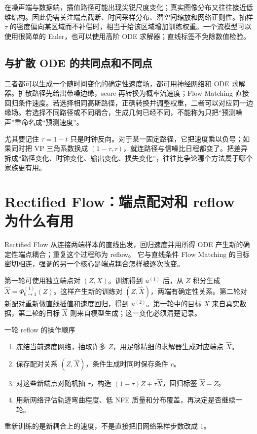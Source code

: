 在噪声端与数据端，插值路径可能出现尖锐尺度变化；真实图像分布又往往接近低维结构。因此仍需关注端点截断、时间采样分布、潜空间缩放和网络正则性。抽样 $\tau$ 的密度偏向某区域而不补偿时，相当于给该区域增加训练权重。一个流模型可以使用很简单的 Euler，也可以使用高阶 ODE 求解器；直线标签不免除数值检验。

\subsection{与扩散 ODE 的共同点和不同点}

二者都可以生成一个随时间变化的确定性速度场，都可用神经网络和 ODE 求解器。扩散路径先给出带噪边缘，score 再转换为概率流速度；Flow Matching 直接回归条件速度。若选择相同高斯路径，正确转换并调整权重，二者可以对应同一边缘场。若选择不同路径或不同耦合，生成几何已经不同，不能称为只把“预测噪声”重命名成“预测速度”。

尤其要记住 $\tau=1-t$ 只是时钟反向。对于某一固定路径，它把速度乘以负号；如果同时把 VP 三角系数换成 $(1-\tau,\tau)$，就连路径与信噪比日程都变了。把差异拆成“路径变化、时钟变化、输出变化、损失变化”，往往比争论哪个方法属于哪个家族更有用。

\section{Rectified Flow：端点配对和 reflow 为什么有用}
\label{sec:m-rectified}

Rectified Flow 从连接两端样本的直线出发，回归速度并用所得 ODE 产生新的确定性端点耦合；重复这个过程称为 reflow。\cite{m_rectified} 它与直线条件 Flow Matching 的目标密切相连，强调的另一个核心是端点耦合怎样被逐次改变。

第一轮可使用独立端点对 $(Z,X)$。训练得到 $u^{(1)}$ 后，从 $Z$ 积分生成
$\widehat X=\Phi^{(1)}_{0\to1}(Z)$。这样产生新的训练对
$(Z,\widehat X)$，两端有确定性关系。第二轮对新配对重新做直线插值和速度回归，得到 $u^{(2)}$。第一轮中的目标 $X$ 来自真实数据，第二轮的目标 $\widehat X$ 则来自模型生成；这一变化必须清楚记录。

\begin{examplebox}{一轮 reflow 的操作顺序}
\begin{enumerate}[leftmargin=*,itemsep=2pt]
\item 冻结当前速度网络，抽取许多 $Z$，用足够精细的求解器生成对应端点 $\widehat X$。
\item 保存配对关系 $(Z,\widehat X)$，条件生成时同时保存条件 $c$。
\item 对这些新端点对随机抽 $\tau$，构造
$(1-\tau)Z+\tau\widehat X$，回归标签 $\widehat X-Z$。
\item 用新网络评估轨迹弯曲程度、低 NFE 质量和分布覆盖，再决定是否继续一轮。
\end{enumerate}
重新训练的是新耦合上的速度，不是直接把旧网络采样步数改成 1。
\end{examplebox}

